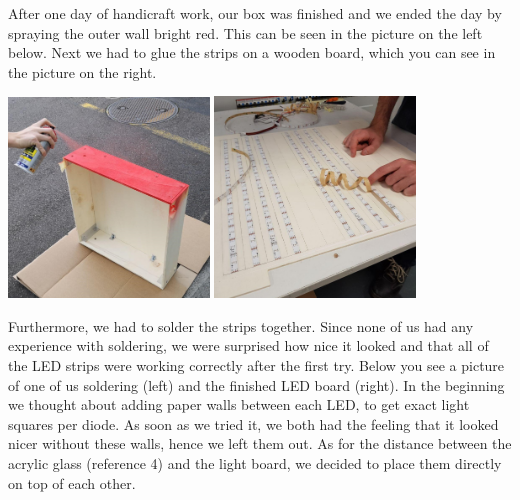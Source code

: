 \documentclass[a4paper,12pt]{article}
\begin{document}
After one day of handicraft work, our box was finished and we ended the day by spraying the outer wall bright red. This can be seen in the picture on the left below.
 Next we had to glue the strips on a wooden board, which you can see in the picture on the right.
 
 \vspace{1cm}

{ \centering
  \includegraphics[width = 0.4\textwidth]{sprayen.jpg}
  \space{   }
  \includegraphics[width = 0.4\textwidth]{kleben.jpg}
  \\}
 \vspace{1cm}
 
Furthermore, we had to solder the strips together.
 Since none of us had any experience with soldering, we were surprised how nice it looked and that all of the LED strips were working correctly after the first try.
 Below you see a picture of one of us soldering (left) and the finished LED board (right).
 In the beginning we thought about adding paper walls between each LED, to get exact light squares per diode.
 As soon as we tried it, we both had the feeling that it looked nicer without these walls, hence we left them out.
 As for the distance between the acrylic glass (reference 4) and the light board, we decided to place them directly on top of each other.
 
 \vspace{1cm}
\end{document}
